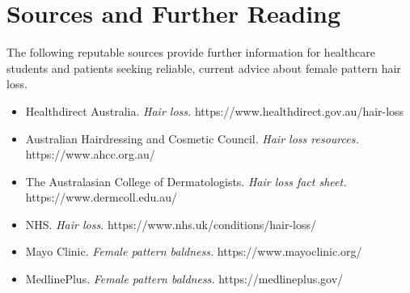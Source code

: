 \section*{Sources and Further Reading}
The following reputable sources provide further information for healthcare students and patients seeking reliable, current advice about female pattern hair loss.
\begin{itemize}
    \item Healthdirect Australia. \textit{Hair loss.} https://www.healthdirect.gov.au/hair-loss
    \item Australian Hairdressing and Cosmetic Council. \textit{Hair loss resources.} https://www.ahcc.org.au/
    \item The Australasian College of Dermatologists. \textit{Hair loss fact sheet.} https://www.dermcoll.edu.au/
    \item NHS. \textit{Hair loss.} https://www.nhs.uk/conditions/hair-loss/
    \item Mayo Clinic. \textit{Female pattern baldness.} https://www.mayoclinic.org/
    \item MedlinePlus. \textit{Female pattern baldness.} https://medlineplus.gov/
\end{itemize}
